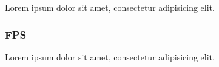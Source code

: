 Lorem ipsum dolor sit amet, consectetur adipisicing elit.


\subsubsection{FPS} %
\label{subsub:evaluation:results:color_tracking_algorithm:fps}

Lorem ipsum dolor sit amet, consectetur adipisicing elit.




